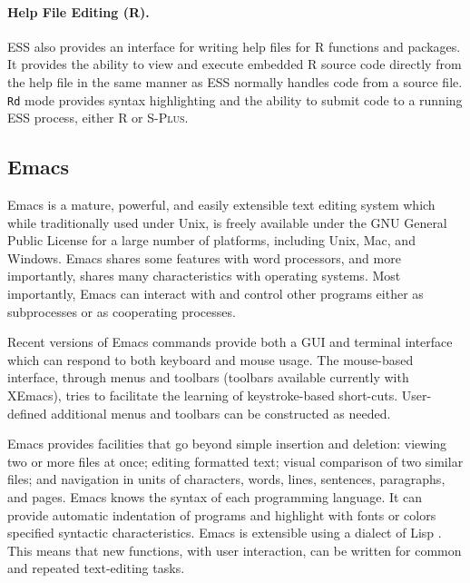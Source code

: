\documentclass{article}
\newcommand*{\Splus}{\textsc{S-Plus}}
\newcommand{\stexttt}[1]{{\small\texttt{#1}}}
\begin{document}
\paragraph{Help File Editing (R).}
ESS also provides an interface for writing help files for R functions
and packages.  It provides the ability to view and execute embedded R
source code directly from the help file in the same manner as ESS
normally handles code from a source file.  \stexttt{Rd} mode provides
syntax highlighting and the ability to submit code to a running ESS
process, either R or \Splus.

\subsection{Emacs}
\label{sec:ESS:emacs}

Emacs \citep{RMS:2000} is a mature, powerful, and easily extensible
text editing system which while traditionally used under Unix, is
freely available under the GNU General Public License for a large
number of platforms, including Unix, Mac, and Windows.  Emacs shares
some features with word processors, and more importantly, shares many
characteristics with operating systems.  Most importantly, Emacs can
interact with and control other programs either as subprocesses or as
cooperating processes.

Recent versions of Emacs commands provide both a GUI and terminal
interface which can respond to both keyboard and mouse usage.  The
mouse-based interface, through menus and toolbars (toolbars available
currently with XEmacs), tries to facilitate the learning of
keystroke-based short-cuts.  User-defined additional menus and
toolbars can be constructed as needed.

Emacs provides facilities that go beyond simple insertion and
deletion: viewing two or more files at once; editing formatted text;
visual comparison of two similar files; and navigation in units of
characters, words, lines, sentences, paragraphs, and pages.  Emacs
knows the syntax of each programming language.  It can provide
automatic indentation of programs and highlight with fonts or colors
specified syntactic characteristics.  Emacs is extensible using a
dialect of Lisp \citep{RChassell1999,PGraham:1996}.  This means that
new functions, with user interaction, can be written for common and
repeated text-editing tasks.
\end{document}
